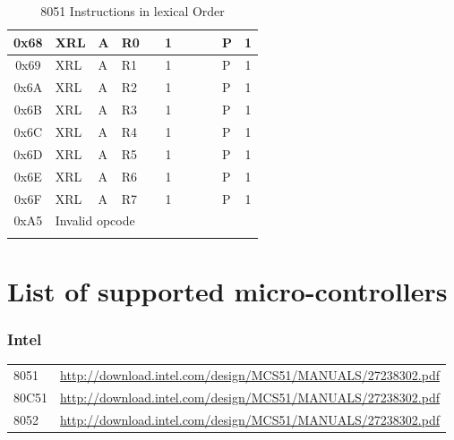 \documentclass[a4paper,twoside,12pt]{book}
\newcommand{\mysmallfont}{\fontsize{8pt}{10pt} \selectfont{}}
\begin{document}
{\begin{longtable}{|c|l|lll|c|llll|c|}
		0x68	& XRL	& A	& R0	&	& 1	&	&	&	& P	& 1	\\\hline
		0x69	& XRL	& A	& R1	&	& 1	&	&	&	& P	& 1	\\\hline
		0x6A	& XRL	& A	& R2	&	& 1	&	&	&	& P	& 1	\\\hline
		0x6B	& XRL	& A	& R3	&	& 1	&	&	&	& P	& 1	\\\hline
		0x6C	& XRL	& A	& R4	&	& 1	&	&	&	& P	& 1	\\\hline
		0x6D	& XRL	& A	& R5	&	& 1	&	&	&	& P	& 1	\\\hline
		0x6E	& XRL	& A	& R6	&	& 1	&	&	&	& P	& 1	\\\hline
		0x6F	& XRL	& A	& R7	&	& 1	&	&	&	& P	& 1	\\\hline
		0xA5	& \multicolumn{10}{l|}{Invalid opcode}						\\\hline

		\caption{8051 Instructions in lexical Order}
	\end{longtable}
	}

\chapter{List of supported micro-controllers}
	\subsection{Intel\textregistered}
		{
		\mysmallfont{}
		\begin{longtable}{ll}
			8051			& \url{http://download.intel.com/design/MCS51/MANUALS/27238302.pdf}		\\
			80C51			& \url{http://download.intel.com/design/MCS51/MANUALS/27238302.pdf}		\\
			8052			& \url{http://download.intel.com/design/MCS51/MANUALS/27238302.pdf}		\\
		\end{longtable}
		}
\end{document}
